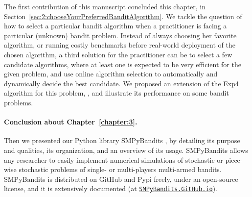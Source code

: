 The first contribution of this manuscript \cite{Besson2018WCNC} concluded this chapter, in Section~\ref{sec:2:chooseYourPreferredBanditAlgorithm}. We tackle the question of how to select a particular bandit algorithm when a practitioner is facing a particular (unknown) bandit problem.
Instead of always choosing her favorite algorithm, or running costly benchmarks before real-world deployment of the chosen algorithm, a third solution for the practitioner can be to select a few candidate algorithms, where at least one is expected to be very efficient for the given problem, and use online algorithm selection to automatically and dynamically decide the best candidate.
We proposed an extension of the Exp4 algorithm for this problem, \Aggr, and illustrate its performance on some bandit problems.


\paragraph{Conclusion about \textbf{Chapter~\ref{chapter:3}}.}

Then we presented our Python library SMPyBandits \cite{SMPyBandits,SMPyBanditsJMLR}, by detailing
its purpose and qualities, its organization, and an overview of its usage.
%
SMPyBandits allows any researcher to easily implement numerical simulations of stochastic or piece-wise stochastic problems of single- or multi-players multi-armed bandits.
SMPyBandits is distributed on GitHub and Pypi freely, under an open-source license, and it is extensively documented (at \href{https://SMPyBandits.GitHub.io}{\texttt{SMPyBandits.GitHub.io}}).

